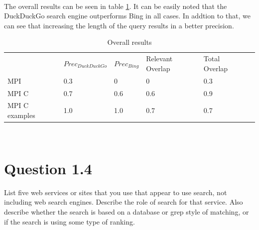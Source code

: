 \documentclass{article}
\begin{document}
\\The overall results can be seen in table \ref{tbl:prec_table}. It can be easily noted that the DuckDuckGo search engine outperforms Bing in all cases. In addtion to that, we can see that increasing the length of the query results in a better precision.
\begin{table}[htb]
\centering
\begin{tabular}{|l|l|l|l|l|l|}
\cline{1-5}
&$Prec_{DuckDuckGo}$  &$Prec_{Bing}$  &Relevant Overlap  &Total Overlap  \\ \cline{1-5}
MPI& 0.3 & 0 &  0& 0.3 \\ \cline{1-5}
MPI C& 0.7 & 0.6 &  0.6&0.9  \\ \cline{1-5}
MPI C examples& 1.0 & 1.0 & 0.7 & 0.7 \\ \cline{1-5}
\end{tabular}
\caption{Overall results}
\label{tbl:prec_table}
\end{table}\\
\section*{Question 1.4}
List five web services or sites that you use that appear to use search, not including web search engines. Describe the role of search for that service. Also describe
whether the search is based on a database or grep style of matching, or if the search
is using some type of ranking.
\end{document}
